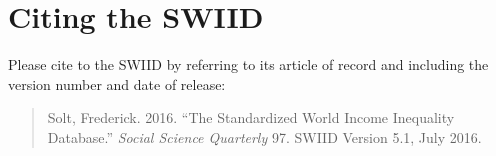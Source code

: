 \documentclass[11pt,]{article}
\theoremstyle{definition}
\theoremstyle{definition}
\theoremstyle{remark}
\begin{document}
\section{Citing the SWIID}\label{citing-the-swiid}

Please cite to the SWIID by referring to its article of record and
including the version number and date of release:

\begin{quote}
Solt, Frederick. 2016. ``The Standardized World Income Inequality
Database.'' \emph{Social Science Quarterly} 97. SWIID Version 5.1, July
2016.
\end{quote}

\newpage
\singlespacing 

\end{document}
